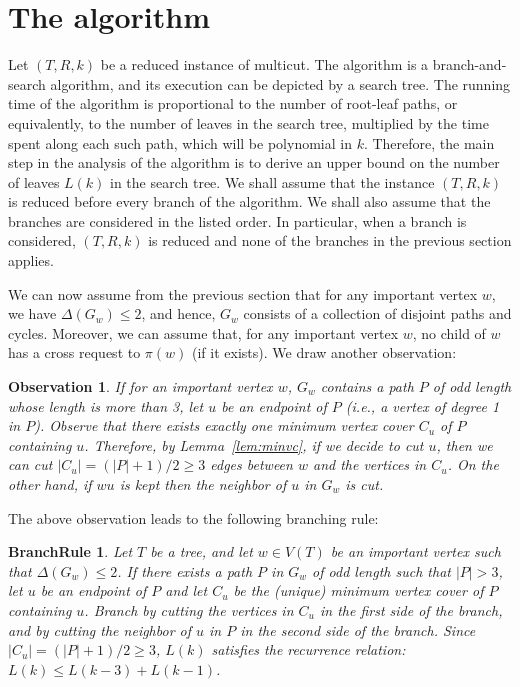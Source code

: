 \documentclass[11pt]{article}
\newtheorem{observation}[theorem]{Observation}
\newtheorem{branchrule}[theorem]{BranchRule}
\begin{document}
\section{The algorithm}
\label{sec:algo}
Let $(T, R, k)$ be a reduced instance of {\sc multicut}. The algorithm is a branch-and-search algorithm, and
its execution can be depicted by a search tree. The running time
of the algorithm is proportional to the number of root-leaf paths,
or equivalently, to the number of leaves in the search tree,
multiplied by the time spent along each such path, which will be polynomial in $k$. Therefore, the
main step in the analysis of the algorithm is to derive an upper
bound on the number of leaves $L(k)$ in the search tree. We shall assume that the instance $(T, R, k)$ is reduced before every branch of the algorithm. We shall also assume that the branches are considered in the listed order. In particular, when a branch is considered, $(T, R, k)$ is reduced and none of the branches in the previous section applies.


We can now assume from the previous section that for any important vertex $w$, we have $\Delta(G_w) \leq 2$, and hence, $G_w$ consists of a collection of disjoint paths and cycles.
Moreover, we can assume that, for any important vertex $w$, no child of $w$ has a cross request to $\pi(w)$ (if it exists). We draw another observation:

\begin{observation}
\label{obs:oddpath}
If for an important vertex $w$, $G_w$ contains a path $P$ of odd length whose length is more than 3, let $u$ be an endpoint of $P$ (i.e., a vertex of degree 1 in $P$). Observe that there exists exactly one minimum vertex cover $C_u$ of $P$ containing $u$. Therefore, by Lemma~\ref{lem:minvc}, if we decide to cut $u$, then we can cut $|C_u| = (|P|+1)/2 \geq 3$ edges between $w$ and the vertices in $C_u$. On the other hand, if $wu$ is kept then the neighbor of $u$ in $G_w$ is cut.
\end{observation}

The above observation leads to the following branching rule:


\begin{branchrule}\label{branch:3}
Let $T$ be a tree, and let $w \in V(T)$ be an important vertex such that $\Delta(G_w) \leq 2$. If there exists a path $P$ in $G_w$ of odd length such that $|P| > 3$, let $u$ be an endpoint of $P$ and let $C_{u}$ be the (unique) minimum vertex cover of $P$ containing $u$. Branch by cutting the vertices in $C_{u}$ in the first side of the branch, and by cutting the neighbor of $u$ in $P$ in the second side of the branch. Since $|C_u| = (|P|+1)/2 \geq 3$, $L(k)$ satisfies the recurrence relation: $L(k) \leq L(k-3) + L(k-1)$.
\end{branchrule}
\end{document}
